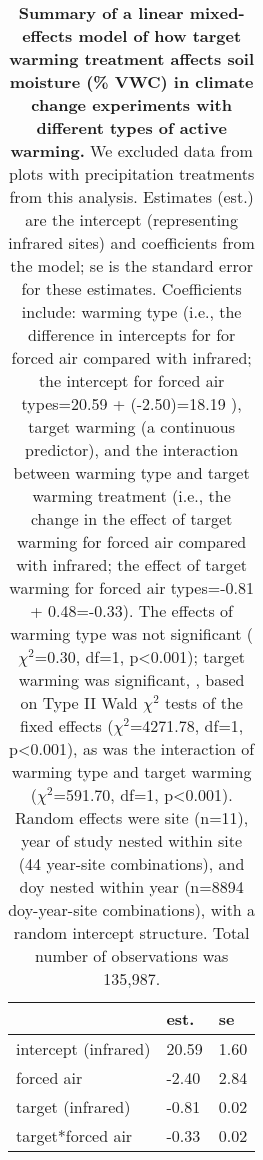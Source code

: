 \documentclass{article}
\begin{document}
\begin{table}[ht]
\centering
\caption{\textbf{Summary of a linear mixed-effects model of how target warming treatment affects soil moisture (\% VWC) in climate change experiments with different types of active warming.} We excluded data from plots with precipitation treatments from this analysis. Estimates (est.) are the intercept (representing infrared sites) and coefficients from the model; se is the standard error for these estimates. Coefficients include: warming type (i.e., the difference in intercepts for for forced air compared with infrared; the intercept for forced air types=20.59 + (-2.50)=18.19 ), target warming (a continuous predictor), and the interaction between warming type and target warming treatment (i.e., the change in the effect of target warming for forced air compared with infrared; the effect of target warming for forced air types=-0.81 + 0.48=-0.33). The effects of warming type was not significant ($\chi^{2}$=0.30, df=1, p<0.001); target warming was significant, , based on Type II Wald $\chi^{2}$ tests of the fixed effects ($\chi^{2}$=4271.78, df=1, p<0.001), as was the interaction of warming type and target warming ($\chi^{2}$=591.70, df=1, p<0.001). Random effects were site (n=11), year of study nested within site (44 year-site combinations), and doy nested within year (n=8894 doy-year-site combinations), with a random intercept structure. Total number of observations was 135,987.} 
\label{table:targsoilmois}
\begingroup\footnotesize
\begin{tabular}{|p{}|p{}p{}|}
  \hline
 & est. & se \\ 
  \hline
intercept (infrared) & 20.59 & 1.60 \\ 
  forced air & -2.40 & 2.84 \\ 
  target (infrared) & -0.81 & 0.02 \\ 
  target*forced air & -0.33 & 0.02 \\ 
   \hline
\end{tabular}
\endgroup
\end{table}\clearpage
\end{document}
